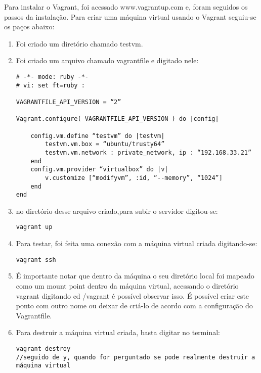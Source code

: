 Para instalar o Vagrant, foi acessado www.vagrantup.com e, 
foram seguidos os passos da instalação. Para criar uma 
máquina virtual usando o Vagrant seguiu-se os paços
abaixo:
\begin{enumerate}
   \item Foi criado um diretório chamado testvm. 
   \item Foi criado um arquivo chamado vagrantfile e 
   digitado nele:
      \begin{lstlisting}
# -*- mode: ruby -*-
# vi: set ft=ruby :

VAGRANTFILE_API_VERSION = “2”

Vagrant.configure( VAGRANTFILE_API_VERSION ) do |config|

	config.vm.define “testvm” do |testvm|
		testvm.vm.box = “ubuntu/trusty64”
		testvm.vm.network : private_network, ip : “192.168.33.21”
	end
	config.vm.provider “virtualbox” do |v|
		v.customize [“modifyvm”, :id, “--memory”, “1024”]
	end
end
      \end{lstlisting}
  \item no diretório desse arquivo criado,para subir o 
  servidor digitou-se:
    \begin{lstlisting}
vagrant up
    \end{lstlisting}

      \item Para testar, foi feita uma conexão com a 
      máquina virtual criada digitando-se:
    \begin{lstlisting}
vagrant ssh
    \end{lstlisting}
   \item É importante notar que dentro da máquina 
    o seu diretório local foi mapeado como um mount 
   point dentro da máquina virtual, acessando o 
   diretório vagrant digitando cd /vagrant é possível 
   observar isso. É possível criar este ponto com 
   outro nome ou deixar de criá-lo de acordo com a 
   configuração do Vagrantfile.
   \item Para destruir a máquina virtual criada, 
   basta digitar no terminal: 
    \begin{lstlisting}
vagrant destroy
//seguido de y, quando for perguntado se pode realmente destruir a máquina virtual
    \end{lstlisting}
\end{enumerate}

